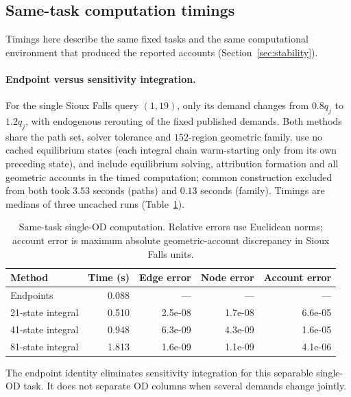 \subsection{Same-task computation timings}\label{supp:timing}
Timings here describe the same fixed tasks and the same computational
environment that produced the reported accounts
(Section~\ref{sec:stability}).

\paragraph{Endpoint versus sensitivity integration.}
For the single Sioux Falls query $(1,19)$, only its demand changes from
$0.8q_j$ to $1.2q_j$, with endogenous rerouting of the fixed published
demands. Both methods share the path set, solver tolerance and
$152$-region geometric family, use no cached equilibrium states (each
integral chain warm-starting only from its own preceding state), and
include equilibrium solving, attribution formation and all geometric
accounts in the timed computation; common construction excluded from
both took $3.53$ seconds (paths) and $0.13$ seconds (family). Timings
are medians of three uncached runs
(Table~\ref{tab:endpointbenchmark}).
\begin{table}[pos=t]\centering\footnotesize\caption{Same-task single-OD computation. Relative errors use Euclidean norms; account error is maximum absolute geometric-account discrepancy in Sioux Falls units.}\label{tab:endpointbenchmark}\begin{tabular}{lrrrr}\toprule Method & Time (s) & Edge error & Node error & Account error\\\midrule
Endpoints & 0.088 & --- & --- & ---\\
21-state integral & 0.510 & 2.5e-08 & 1.7e-08 & 6.6e-05\\
41-state integral & 0.948 & 6.3e-09 & 4.3e-09 & 1.6e-05\\
81-state integral & 1.813 & 1.6e-09 & 1.1e-09 & 4.1e-06\\
\bottomrule\end{tabular}\end{table}
The endpoint identity eliminates sensitivity integration for this
separable single-OD task. It does not separate OD columns when several
demands change jointly.

